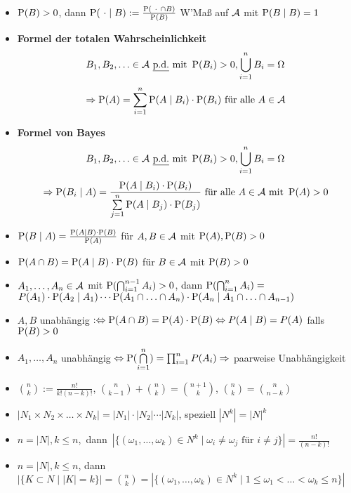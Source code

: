 \begin{itemize}
\item $\P(B)>0$, dann $\P(\ \cdot\mid B) := \frac{\P(\ \cdot\ \cap B)}{\P(B)}$
W'Maß auf $\A$ mit $\P(B\mid B)=1$

\item \textbf{Formel der totalen Wahrscheinlichkeit}
\[
	B_1, B_2,\ldots \in\A \text{ \underline{p.d.} mit } \P(B_i)>0, 
	\bigcup_{i=1}^{n} B_i = \Omega
\]
\[
	\Rightarrow \P(A)=\sum_{i=1}^{n} \P(A\mid B_i)\cdot\P(B_i)
	\text{ für alle } A\in\A
\]

\item \textbf{Formel von Bayes}
\[
	B_1, B_2,\ldots \in\A \text{ \underline{p.d.} mit } \P(B_i)>0, 
	\bigcup_{i=1}^{n} B_i = \Omega
\]
\[
	\Rightarrow\P(B_i\mid A)=
	\frac{\P(A\mid B_i)\cdot\P(B_i)}{\sum\limits_{j=1}^{n} \P(A\mid B_j)\cdot\P(B_j)}\ 
	\text{für alle } A\in\A \text{ mit } \P(A)>0
\]

\item $\P(B\mid A)=\frac{\P(A\mid B)\cdot\P(B)}{\P(A)}$ für $A,B\in\A$ mit
$\P(A),\P(B)>0$

\item $\P(A\cap B)=\P(A\mid B)\cdot\P(B)$ für $B\in\A$ mit $\P(B)>0$

\item $A_1,\ldots ,A_n\in\A$ mit $\P(\bigcap_{i=1}^{n-1} A_i)>0$, dann $\P(\bigcap_{i=1}^{n} A_i)=$\\ 
$P(A_1)\cdot\P(A_2\mid A_1)\cdots
\P(A_1\cap\ldots\cap A_n)\cdot\P(A_n\mid A_1\cap\ldots\cap A_{n-1})$

\item $A,B$ unabhängig $:\Leftrightarrow \P(A\cap B)=\P(A)\cdot\P(B)
\Leftrightarrow P(A\mid B) = P(A)$ falls $\P(B)>0$

\item $A_1,\ldots ,A_n$ unabhängig 
$\Leftrightarrow\P(\bigcap\limits_{i=1}^{n})=\prod_{i=1}^{n} P(A_i)
\Rightarrow$ paarweise Unabhängigkeit

\item $\binom{n}{k}:= \frac{n!}{k!(n-k)!}$, 
$\binom{n}{k-1}+\binom{n}{k}=\binom{n+1}{k}$,
$\binom{n}{k}=\binom{n}{n-k}$

\item $ |N_1 \times N_2 \times\dots\times N_k| = |N_1| \cdot |N_2| \cdots |N_k|$,
speziell $|N^k| = {|N|}^k$

\item \mbox{$n=|N|,k\leq n$, dann $|\{(\omega_1,\ldots,\omega_k)\in N^k 
\mid\omega_i\neq\omega_j\text { für }i\neq j\}|=\frac{n!}{(n-k)!}$}

\item $n=|N|,k\leq n$, dann $|\{K\subset N\mid |K|=k\}| = \binom{n}{k} =
|\{(\omega_1,\ldots,\omega_k)\in N^k \mid 1\leq\omega_1<\ldots<\omega_k\leq n\}|$


\end{itemize}
